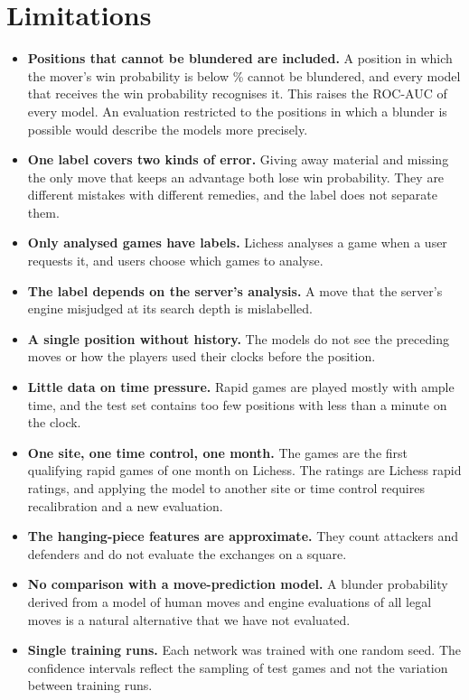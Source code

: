 \documentclass[11pt]{article}
\begin{document}
\section{Limitations}
\label{sec:limits}

\begin{itemize}
\item \textbf{Positions that cannot be blundered are included.} A position
in which the mover's win probability is below \% cannot
be blundered, and every model that receives the win probability recognises
it. This raises the ROC-AUC of every model. An evaluation restricted to the
positions in which a blunder is possible would describe the models more
precisely.
\item \textbf{One label covers two kinds of error.} Giving away material and
missing the only move that keeps an advantage both lose win probability.
They are different mistakes with different remedies, and the label does not
separate them.
\item \textbf{Only analysed games have labels.} Lichess analyses a game when
a user requests it, and users choose which games to analyse.
\item \textbf{The label depends on the server's analysis.} A move that the
server's engine misjudged at its search depth is mislabelled.
\item \textbf{A single position without history.} The models do not see the
preceding moves or how the players used their clocks before the position.
\item \textbf{Little data on time pressure.} Rapid games are played mostly
with ample time, and the test set contains too few positions with less than
a minute on the clock.
\item \textbf{One site, one time control, one month.} The games are the
first qualifying rapid games of one month on Lichess. The ratings are Lichess
rapid ratings, and applying the model to another site or time control
requires recalibration and a new evaluation.
\item \textbf{The hanging-piece features are approximate.} They count
attackers and defenders and do not evaluate the exchanges on a square.
\item \textbf{No comparison with a move-prediction model.} A blunder
probability derived from a model of human moves and engine evaluations of all
legal moves is a natural alternative that we have not evaluated.
\item \textbf{Single training runs.} Each network was trained with one
random seed. The confidence intervals reflect the sampling of test games and
not the variation between training runs.
\end{itemize}
\end{document}

